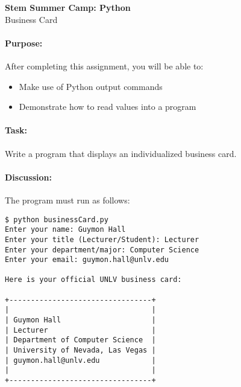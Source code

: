 \documentclass[11pt]{article}
\begin{document}
    \begin{center}

        \large\textbf{Stem Summer Camp: Python} \\
        Business Card \\

    \end{center}

    \paragraph{Purpose:} After completing this assignment, you will be
    able to:

        \begin{itemize}

            \item Make use of Python output commands

            \item Demonstrate how to read values into a program

        \end{itemize}

    \paragraph{Task:} Write a program that displays an
    individualized business card.  
    
    \paragraph{Discussion:} The program must run as follows:
    
    \vspace{1.5em}

\begin{verbatim}
$ python businessCard.py
Enter your name: Guymon Hall
Enter your title (Lecturer/Student): Lecturer
Enter your department/major: Computer Science
Enter your email: guymon.hall@unlv.edu

Here is your official UNLV business card:

+---------------------------------+
|                                 |
| Guymon Hall                     |
| Lecturer                        |
| Department of Computer Science  |
| University of Nevada, Las Vegas |
| guymon.hall@unlv.edu            |
|                                 |
+---------------------------------+
\end{verbatim}
\end{document}
